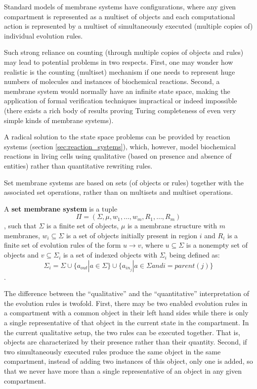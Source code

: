  Standard models of membrane systems have configurations, where any given compartment is represented as a multiset of objects and each computational action is represented by a multiset of simultaneously executed (multiple copies of) individual evolution rules.

Such strong reliance on counting (through multiple copies of objects and rules) may lead to potential problems in two respects. First, one may wonder how realistic is the counting (multiset) mechanism if one needs to represent huge numbers of molecules and instances of biochemical reactions. Second, a membrane system would normally have an infinite state space, making the application
of formal verification techniques impractical or indeed impossible (there exists a rich body of results proving Turing completeness of even very simple kinds of membrane systems).

A radical solution to the state space problems can be provided by reaction systems (section \ref{sec:reaction_systems}), which, however, model biochemical reactions in living cells using qualitative (based on presence and absence of entities) rather than quantitative rewriting rules.

Set membrane systems \cite{Kleijn11SetMembrane} are based on sets (of objects or rules) together with the associated set operations, rather than on multisets and multiset operations.

\begin{definition}
  A {\bf set membrane system} is a tuple $$\Pi = (\Sigma, \mu, w_1, \ldots, w_m, R_1, \ldots, R_m)$$, such that $\Sigma$ is a finite set of objects, $\mu$ is a membrane structure with $m$ membranes, $w_i\subseteq\Sigma$ is a set of objects initially present in region $i$ and $R_i$ is a finite set of evolution rules of the form $u\rightarrow v$, where $u\subseteq\Sigma$ is a nonempty set of objects and $v\subseteq\Sigma_i$ is a set of indexed objects with $\Sigma_i$ being defined as: $$\Sigma_i = \Sigma\cup\{a_{out}|a\in \Sigma\}\cup\{a_{in_j}|a\in\Sigma\mathrel{and}i=parent(j)\}$$.
\end{definition}

The difference between the ``qualitative'' and the ``quantitative'' interpretation of the evolution rules is twofold. First, there may be two enabled evolution rules in a compartment with a common object in their left hand sides while there is only a single representative of that object in the current state in the compartment. In the current qualitative setup, the two rules can be executed together. That is, objects are characterized by their presence rather than their quantity. Second, if two simultaneously executed rules produce the same object in the same compartment, instead of adding two instances of this object, only one is added, so that we never have more than a single representative of an object in any given compartment.


